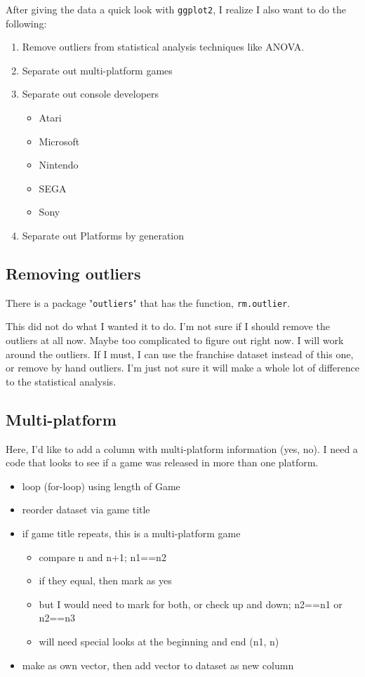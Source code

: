 After giving the data a quick look with \texttt{ggplot2}, I realize I also want to do the following:
\begin{enumerate}
\item Remove outliers from statistical analysis techniques like ANOVA.
\item Separate out multi-platform games
\item Separate out console developers
  \begin{itemize}
  \item Atari
  \item Microsoft
  \item Nintendo
  \item SEGA
  \item Sony
  \end{itemize}
\item Separate out Platforms by generation
\end{enumerate}

\subsection{Removing outliers}
There is a package "\texttt{outliers}" that has the function, \texttt{rm.outlier}.

This did not do what I wanted it to do. I'm not sure if I should remove the outliers at all now. Maybe too complicated to figure out right now. I will work around the outliers. If I must, I can use the franchise dataset instead of this one, or remove by hand outliers. I'm just not sure it will make a whole lot of difference to the statistical analysis.

\subsection{Multi-platform}
Here, I'd like to add a column with multi-platform information (yes, no). I need a code that looks to see if a game was released in more than one platform.
\begin{itemize}
\item loop (for-loop) using length of Game
\item reorder dataset via game title
\item if game title repeats, this is a multi-platform game
  \begin{itemize}
  \item compare n and n+1; n1==n2
  \item if they equal, then mark as yes
  \item but I would need to mark for both, or check up and down; n2==n1 or n2==n3
  \item will need special looks at the beginning and end (n1, n)
  \end{itemize}
\item make as own vector, then add vector to dataset as new column
\end{itemize}

